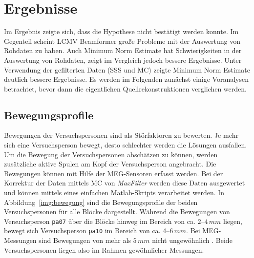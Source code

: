 \documentclass[doc,a4paper,12pt]{apa6}
\begin{document}

\section{Ergebnisse}
\label{sec:ergebnisse}

Im Ergebnis zeigte sich, dass die Hypothese nicht bestätigt werden konnte. Im Gegenteil scheint LCMV Beamformer große Probleme mit der Auswertung von Rohdaten zu haben. Auch Minimum Norm Estimate hat Schwierigkeiten in der Auswertung von Rohdaten, zeigt im Vergleich jedoch bessere Ergebnisse. Unter Verwendung der gefilterten Daten (SSS und MC) zeigte Minimum Norm Estimate deutlich bessere Ergebnisse. Es werden im Folgenden zunächst einige Voranalysen betrachtet, bevor dann die eigentlichen Quellrekonstruktionen verglichen werden.

\subsection{Bewegungsprofile}
\label{sec:bewegung}

Bewegungen der Versuchspersonen sind als Störfaktoren zu bewerten. Je mehr sich eine Versuchsperson bewegt, desto schlechter werden die Lösungen ausfallen. Um die Bewegung der Versuchspersonen abschätzen zu können, werden zusätzliche aktive Spulen am Kopf der Versuchsperson angebracht. Die Bewegungen können mit Hilfe der MEG-Sensoren erfasst werden. Bei der Korrektur der Daten mittels MC von \emph{MaxFilter} werden diese Daten ausgewertet und können mittels eines einfachen Matlab-Skripts verarbeitet werden. In Abbildung~\ref{img:bewegung} sind die Bewegungsprofile der beiden Versuchspersonen für alle Blöcke dargestellt. Während die Bewegungen von Versuchsperson \texttt{pa07} über die Blöcke hinweg im Bereich von ca. $2$--$4\,mm$ liegen, bewegt sich Versuchsperson \texttt{pa10} im Bereich von ca. $4$--$6\,mm$. Bei MEG-Messungen sind Bewegungen von mehr als $5\,mm$ nicht ungewöhnlich \parencite{wilson2007continuous}. Beide Versuchspersonen liegen also im Rahmen gewöhnlicher Messungen.
\end{document}
